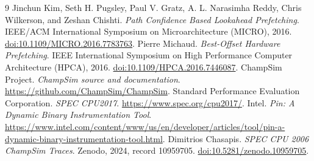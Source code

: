 \documentclass[a4paper,11pt]{article}
\begin{document}
\begin{thebibliography}{9}
 Jinchun Kim, Seth H. Pugsley, Paul V. Gratz, A. L. Narasimha Reddy, Chris Wilkerson, and Zeshan Chishti. \textit{Path Confidence Based Lookahead Prefetching}. IEEE/ACM International Symposium on Microarchitecture (MICRO), 2016. \href{https://doi.org/10.1109/MICRO.2016.7783763}{doi:10.1109/MICRO.2016.7783763}.
 Pierre Michaud. \textit{Best-Offset Hardware Prefetching}. IEEE International Symposium on High Performance Computer Architecture (HPCA), 2016. \href{https://doi.org/10.1109/HPCA.2016.7446087}{doi:10.1109/HPCA.2016.7446087}.
 ChampSim Project. \textit{ChampSim source and documentation}. \url{https://github.com/ChampSim/ChampSim}.
 Standard Performance Evaluation Corporation. \textit{SPEC CPU2017}. \url{https://www.spec.org/cpu2017/}.
 Intel. \textit{Pin: A Dynamic Binary Instrumentation Tool}. \url{https://www.intel.com/content/www/us/en/developer/articles/tool/pin-a-dynamic-binary-instrumentation-tool.html}.
 Dimitrios Chasapis. \textit{SPEC CPU 2006 ChampSim Traces}. Zenodo, 2024, record 10959705. \href{https://doi.org/10.5281/zenodo.10959705}{doi:10.5281/zenodo.10959705}.
\end{thebibliography}
\end{document}
